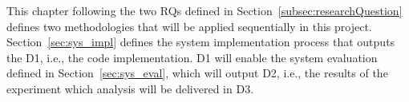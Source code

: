 This chapter following the two \glspl{RQ} defined in Section~\ref{subsec:researchQuestion} defines two methodologies that will be applied sequentially in this project. Section~\ref{sec:sys_impl} defines the system implementation process that outputs the D1, i.e., the code implementation. D1 will enable the system evaluation defined in Section~\ref{sec:sys_eval}, which will output D2, i.e., the results of the experiment which analysis will be delivered in D3.